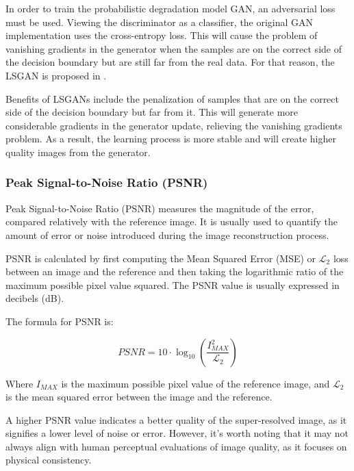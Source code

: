         In order to train the probabilistic degradation model GAN, an adversarial loss must be used. 
        Viewing the discriminator as a classifier, the original GAN implementation uses the cross-entropy loss. This will cause the problem of vanishing gradients in the generator when the samples are on the correct side of the decision boundary but are still far from the real data. For that reason, the LSGAN is proposed in \cite{mao2017squares}. 
        
        Benefits of LSGANs include the penalization of samples that are on the correct side of the decision boundary but far from it. This will generate more considerable gradients in the generator update, relieving the vanishing gradients problem. As a result, the learning process is more stable and will create higher quality images from the generator.

        

        \subsubsection{Peak Signal-to-Noise Ratio (PSNR)}

         
            Peak Signal-to-Noise Ratio (PSNR) measures the magnitude of the error, compared relatively with the reference image. It is usually used to quantify the amount of error or noise introduced during the image reconstruction process.
            
            PSNR is calculated by first computing the Mean Squared Error (MSE) or $\mathcal{L}_2$ loss between an image and the reference and then taking the logarithmic ratio of the maximum possible pixel value squared. The PSNR value is usually expressed in decibels (dB).
            
            The formula for PSNR is:
            
            \begin{equation}
            PSNR = 10 \cdot \log_{10} \left( \frac{I_{MAX}^{2}}{\mathcal{L}_2} \right)
            \end{equation}
            
            Where $I_{MAX}$ is the maximum possible pixel value of the reference image, and $\mathcal{L}_2$ is the mean squared error between the image and the reference.
            
            A higher PSNR value indicates a better quality of the super-resolved image, as it signifies a lower level of noise or error. However, it's worth noting that it may not always align with human perceptual evaluations of image quality, as it focuses on physical consistency.

